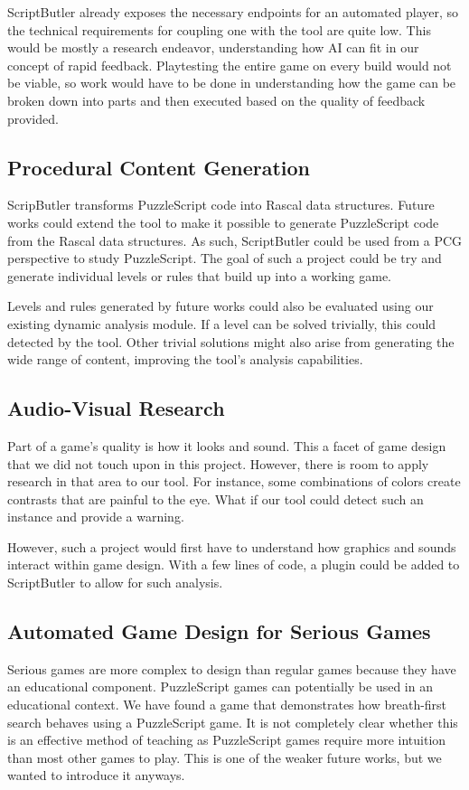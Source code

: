 ScriptButler already exposes the necessary endpoints for an automated player, so the technical requirements for coupling one with the tool are quite low. This would be mostly a research endeavor, understanding how AI can fit in our concept of rapid feedback. Playtesting the entire game on every build would not be viable, so work would have to be done in understanding how the game can be broken down into parts and then executed based on the quality of feedback provided.

\subsection{Procedural Content Generation}
ScripButler transforms PuzzleScript code into Rascal data structures. Future works could extend the tool to make it possible to generate PuzzleScript code from the Rascal data structures. As such, ScriptButler could be used from a PCG perspective to study PuzzleScript. The goal of such a project could be try and generate individual levels or rules that build up into a working game. 

Levels and rules generated by future works could also be evaluated using our existing dynamic analysis module. If a level can be solved trivially, this could detected by the tool. Other trivial solutions might also arise from generating the wide range of content, improving the tool's analysis capabilities.

\subsection{Audio-Visual Research}
Part of a game's quality is how it looks and sound. This a facet of game design that we did not touch upon in this project. However, there is room to apply research in that area to our tool. For instance, some combinations of colors create contrasts that are painful to the eye. What if our tool could detect such an instance and provide a warning.

However, such a project would first have to understand how graphics and sounds interact within game design. With a few lines of code, a plugin could be added to ScriptButler to allow for such analysis.


\subsection{Automated Game Design for Serious Games}
Serious games are more complex to design than regular games because they have an educational component\cite{DBLP:conf/dagstuhl/BraadZS15}. PuzzleScript games can potentially be used in an educational context. We have found a game that demonstrates how breath-first search behaves using a PuzzleScript game\cite{puzzlescript-bfs}. It is not completely clear whether this is an effective method of teaching as PuzzleScript games require more intuition than most other games to play. This is one of the weaker future works, but we wanted to introduce it anyways.


